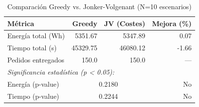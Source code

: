 \begin{table}[htbp]
\centering
\caption{Comparación Greedy vs. Jonker-Volgenant (N=10 escenarios)}
\label{tab:comparison}
\begin{tabular}{lrrr}
\hline
\textbf{Métrica} & \textbf{Greedy} & \textbf{JV (Costes)} & \textbf{Mejora (\%)} \\
\hline
Energía total (Wh) & 5351.67 & 5347.89 & 0.07 \\
Tiempo total (s) & 45329.75 & 46080.12 & -1.66 \\
Pedidos entregados & 150.0 & 150.0 & — \\
\hline
\multicolumn{4}{l}{\textit{Significancia estadística (p < 0.05):}} \\
Energía (p-value) & \multicolumn{2}{c}{0.2180} & No \\
Tiempo (p-value) & \multicolumn{2}{c}{0.2244} & No \\
\hline
\end{tabular}
\end{table}